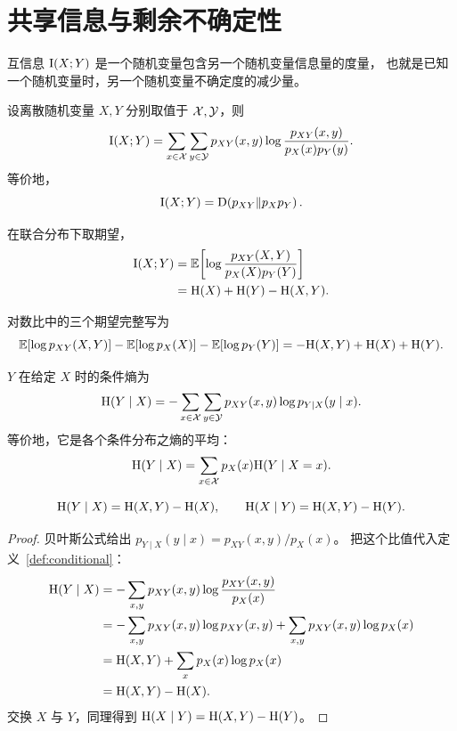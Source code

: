 \section{共享信息与剩余不确定性}\label{sec:mutual}
\quad{}

\begin{strand}
互信息 $\mathrm{I}(X;Y)$ 是一个随机变量包含另一个随机变量信息量的度量，
也就是已知一个随机变量时，另一个随机变量不确定度的减少量。
\end{strand}

\begin{definition}[互信息]\label{def:mi}
设离散随机变量 $X,Y$ 分别取值于 $\mathcal{X},\mathcal{Y}$，则
\[
  \mathrm{I}(X;Y)
  =\sum_{x\in\mathcal{X}}\sum_{y\in\mathcal{Y}}
   p_{XY}(x,y)\log\frac{p_{XY}(x,y)}{p_X(x)p_Y(y)}.
\]
等价地，
\[
  \mathrm{I}(X;Y)=\mathrm{D}\!\left(p_{XY}\Vert p_Xp_Y\right).
\]
\end{definition}

在联合分布下取期望，
\begin{align*}
  \mathrm{I}(X;Y)
  &=\mathbb{E}\!\left[\log\frac{p_{XY}(X,Y)}{p_X(X)p_Y(Y)}\right]\\
  &=\mathrm{H}(X)+\mathrm{H}(Y)-\mathrm{H}(X,Y).
\end{align*}

对数比中的三个期望完整写为
\[
  \mathbb{E}[\log p_{XY}(X,Y)]
  -\mathbb{E}[\log p_X(X)]
  -\mathbb{E}[\log p_Y(Y)]
  =-\mathrm{H}(X,Y)+\mathrm{H}(X)+\mathrm{H}(Y).
\]


\begin{definition}[条件熵]\label{def:conditional}
$Y$ 在给定 $X$ 时的条件熵为
\[
  \mathrm{H}(Y\mid X)
  =-\sum_{x\in\mathcal{X}}\sum_{y\in\mathcal{Y}}
    p_{XY}(x,y)\log p_{Y\mid X}(y\mid x).
\]
等价地，它是各个条件分布之熵的平均：
\[
  \mathrm{H}(Y\mid X)
  =\sum_{x\in\mathcal{X}}p_X(x)\mathrm{H}(Y\mid X=x).
\]
\end{definition}

\begin{proposition}[链式法则]\label{prop:chain}
\[
  \mathrm{H}(Y\mid X)=\mathrm{H}(X,Y)-\mathrm{H}(X),
  \qquad
  \mathrm{H}(X\mid Y)=\mathrm{H}(X,Y)-\mathrm{H}(Y).
\]
\end{proposition}
\begin{proof}
贝叶斯公式给出
$p_{Y\mid X}(y\mid x)=p_{XY}(x,y)/p_X(x)$。
把这个比值代入定义~\ref{def:conditional}：
\begin{align*}
  \mathrm{H}(Y\mid X)
  &=-\sum_{x,y}p_{XY}(x,y)
    \log\frac{p_{XY}(x,y)}{p_X(x)}\\
  &=-\sum_{x,y}p_{XY}(x,y)\log p_{XY}(x,y)
    +\sum_{x,y}p_{XY}(x,y)\log p_X(x)\\
  &=\mathrm{H}(X,Y)+\sum_xp_X(x)\log p_X(x)\\
  &=\mathrm{H}(X,Y)-\mathrm{H}(X).
\end{align*}
交换 $X$ 与 $Y$，同理得到
$\mathrm{H}(X\mid Y)=\mathrm{H}(X,Y)-\mathrm{H}(Y)$。
\end{proof}

